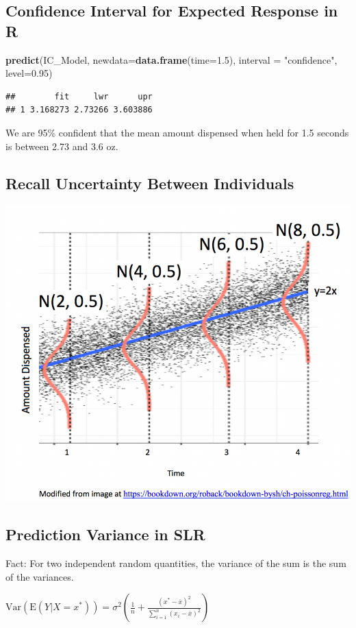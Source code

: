 \documentclass[]{book}
\newenvironment{Shaded}{\begin{snugshade}}{\end{snugshade}}
\newcommand{\KeywordTok}[1]{\textcolor[rgb]{0.13,0.29,0.53}{\textbf{#1}}}
\newcommand{\DataTypeTok}[1]{\textcolor[rgb]{0.13,0.29,0.53}{#1}}
\newcommand{\FloatTok}[1]{\textcolor[rgb]{0.00,0.00,0.81}{#1}}
\newcommand{\StringTok}[1]{\textcolor[rgb]{0.31,0.60,0.02}{#1}}
\newcommand{\NormalTok}[1]{#1}
\begin{document}
\subsection{Confidence Interval for Expected Response in
R}\label{confidence-interval-for-expected-response-in-r}

\begin{Shaded}
\begin{Highlighting}[]
\KeywordTok{predict}\NormalTok{(IC_Model, }\DataTypeTok{newdata=}\KeywordTok{data.frame}\NormalTok{(}\DataTypeTok{time=}\FloatTok{1.5}\NormalTok{), }\DataTypeTok{interval =} \StringTok{"confidence"}\NormalTok{, }\DataTypeTok{level=}\FloatTok{0.95}\NormalTok{)}
\end{Highlighting}
\end{Shaded}

\begin{verbatim}
##        fit     lwr      upr
## 1 3.168273 2.73266 3.603886
\end{verbatim}

We are 95\% confident that the mean amount dispensed when held for 1.5
seconds is between 2.73 and 3.6 oz.

\subsection{Recall Uncertainty Between
Individuals}\label{recall-uncertainty-between-individuals}

\includegraphics[width=0.5\linewidth]{SLR_Model_Assumptions}

\subsection{Prediction Variance in
SLR}\label{prediction-variance-in-slr}

Fact: For two independent random quantities, the variance of the sum is
the sum of the variances.

\(\text{Var}(\text{E}(Y|X=x^*))=\sigma^2\left(\frac{1}{n}+ \frac{(x^*-\bar{x})^2}{\displaystyle\sum_{i=1}^n(x_i-\bar{x})^2}\right)\)
\end{document}
